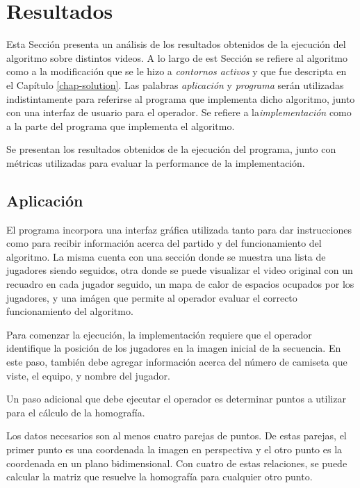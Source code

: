 \chapter{Resultados}
\label{chap-results}

Esta Sección presenta un análisis de los resultados obtenidos de la ejecución del algoritmo sobre distintos videos. A lo largo de est Sección se refiere al algoritmo como a la modificación que se le hizo a \textit{contornos activos} y que fue descripta en el Capítulo \ref{chap-solution}. Las palabras \textit{aplicación} y \textit{programa} serán utilizadas indistintamente para referirse al programa que implementa dicho algoritmo, junto con una interfaz de usuario para el operador. Se refiere a la\textit{implementación} como a la parte del programa que implementa el algoritmo.

Se presentan los resultados obtenidos de la ejecución del programa, junto con métricas utilizadas para evaluar la performance de la implementación.

\section{Aplicación}

El programa incorpora una interfaz gráfica utilizada tanto para dar instrucciones como para recibir información acerca del partido y del funcionamiento del algoritmo. La misma cuenta con una sección donde se muestra una lista de jugadores siendo seguidos, otra donde se puede visualizar el video original con un recuadro en cada jugador seguido, un mapa de calor de espacios ocupados por los jugadores, y una imágen que permite al operador evaluar el correcto funcionamiento del algoritmo.

Para comenzar la ejecución, la implementación requiere que el operador identifique la posición de los jugadores en la imagen inicial de la secuencia. En este paso, también debe agregar información acerca del número de camiseta que viste, el equipo, y nombre del jugador.

Un paso adicional que debe ejecutar el operador es determinar puntos a utilizar para el cálculo de la homografía.

Los datos necesarios son al menos cuatro parejas de puntos. De estas parejas, el primer punto es una coordenada la imagen en perspectiva y el otro punto es la coordenada en un plano bidimensional. Con cuatro de estas relaciones, se puede calcular la matriz que resuelve la homografía para cualquier otro punto.  

